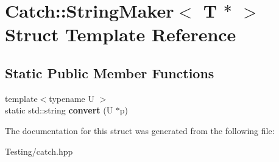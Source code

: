 \hypertarget{struct_catch_1_1_string_maker_3_01_t_01_5_01_4}{\section{Catch\-:\-:String\-Maker$<$ T $\ast$ $>$ Struct Template Reference}
\label{struct_catch_1_1_string_maker_3_01_t_01_5_01_4}
}
\subsection*{Static Public Member Functions}
\begin{DoxyCompactItemize}
\item 
\hypertarget{struct_catch_1_1_string_maker_3_01_t_01_5_01_4_a2adbc75c99d71b8323f4052bcb0815c9}{{\footnotesize template$<$typename U $>$ }\\static std\-::string {\bfseries convert} (U $\ast$p)}\label{struct_catch_1_1_string_maker_3_01_t_01_5_01_4_a2adbc75c99d71b8323f4052bcb0815c9}

\end{DoxyCompactItemize}


The documentation for this struct was generated from the following file\-:\begin{DoxyCompactItemize}
\item 
Testing/catch.\-hpp\end{DoxyCompactItemize}
